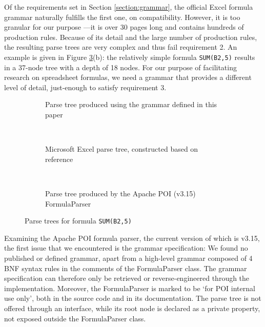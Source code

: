 \documentclass[times]{smrauth}
\begin{document}
Of the requirements set in Section \ref{section:grammar}, the official Excel formula grammar naturally fulfills the first one, on compatibility.
However, it is too granular for our purpose ---it is over 30 pages long and contains hundreds of production rules. Because of its detail and the large number of production rules, the resulting parse trees are very complex and thus fail requirement 2.
An example is given in Figure \ref{figure:parsetrees}(b): the relatively simple formula \texttt{SUM(B2,5)} results in a 37-node tree with a depth of 18 nodes.
For our purpose of facilitating research on spreadsheet formulas, we need a grammar that provides a different level of detail, just-enough to satisfy requirement 3.

\begin{figure}
	\centering
	\begin{subfigure}[b]{0.4\textwidth}
		\centering
		\vspace{1em}
		\hspace{-0.5em}
		\scalebox{.7}{
			
		}
		\caption{Parse tree produced using the grammar defined in this paper}
		\label{figure:ourparsetree}
	\end{subfigure}
	~
	\begin{subfigure}[b]{0.4\textwidth}
		\centering
		\hspace{-2em}
		\scalebox{.7}{
			
		}
		\caption{Microsoft Excel parse tree, constructed based on reference \cite{ExcelOfficialGrammar}}
	\end{subfigure}
	~
	\begin{subfigure}[b]{1\textwidth}
		\centering
		\vspace{1em}
		\hspace{-0.5em}
		\scalebox{.7}{
			
		}
		\caption{Parse tree produced by the Apache POI (v3.15) FormulaParser}%
		\label{figure:parseTreePOI}
	\end{subfigure}
	\caption{Parse trees for formula \texttt{SUM(B2,5)}}
	\label{figure:parsetrees}
\end{figure}

Examining the Apache POI formula parser, the current version of which is v3.15, the first issue that we encountered is the grammar specification: We found no published or defined grammar, apart from a high-level grammar composed of 4 BNF syntax rules in the comments of the FormulaParser class. The grammar specification can therefore only be retrieved or reverse-engineered through the implementation. Moreover, the FormulaParser is marked to be `for POI internal use only', both in the source code and in its documentation. The parse tree is not offered through an interface, while its root node is declared as a private property, not exposed outside the FormulaParser class.
\end{document}
